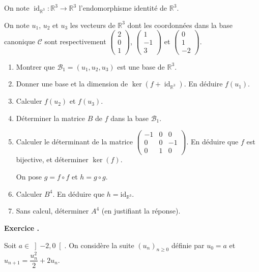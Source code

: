 \documentclass[10pt,a4paper,french]{article}
\newcounter{exono}
\newcounter{questionno}
\newcommand\exo
  {\addtocounter{exono}{1}
   \bigbreak\textbf{Exercice \theexono.\ }
   \setcounter{questionno}{0}}
\newcommand\R{{\mathbb{R}}}
\DeclareMathOperator{\id}{id}
\begin{document}
On note $\id_{\R^3} : \R^3 \to \R^3$ l'endomorphisme identité de $\R^3$.

On note $u_1$, $u_2$ et $u_3$ les vecteurs de $\R^3$ dont les coordonnées dans la base canonique $\mathcal{C}$ sont respectivement $\begin{pmatrix} 2 \\0 \\1 \end{pmatrix}$, $\begin{pmatrix} 1 \\-1 \\3\end{pmatrix}$ et $\begin{pmatrix} 0 \\1 \\-2 \end{pmatrix}$.

\begin{enumerate}
\item Montrer que $\mathcal{B}_1=(u_1, u_2, u_3)$ est une base de $\R^3$.
\item Donner une base et la dimension de $\ker(f+\id_{\R^3})$. En déduire $f(u_1)$.
\item Calculer $f(u_2)$ et $f(u_3)$. 
\item Déterminer la matrice $B$ de $f$ dans la base $\mathcal{B}_1$. 
\item Calculer le déterminant de la matrice $\begin{pmatrix} -1 & 0 & 0 \\ 0 & 0 & -1 \\ 0 & 1 & 0 \end{pmatrix}$. En déduire que $f$ est bijective, et déterminer $\ker(f)$.

On pose $g=f \circ f$ et $h=g \circ g$. 

\item Calculer $B^4$. En déduire que $h=\text{id}_{\R^3}$. 
\item Sans calcul, déterminer $A^4$ (en justifiant la réponse).
\end{enumerate}


\exo 

Soit $a \in \left]-2, 0\right[$. On considère la suite $(u_n)_{n \geq 0}$ définie par $u_0=a$ et $u_{n+1}=\dfrac{u_n^2}2+2u_n$.
\end{document}

